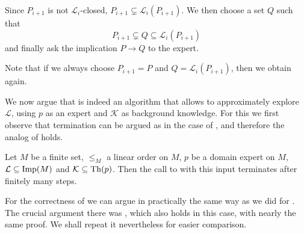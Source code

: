 Since $P_{i+1}$ is not $\mathcal{L}_{i}$-closed, $P_{i+1} \subsetneq
\mathcal{L}_{i}(P_{i+1})$.  We then choose a set $Q$ such that
\begin{equation*}
  P_{i+1} \subsetneq Q \subseteq \mathcal{L}_{i}(P_{i+1})
\end{equation*}
and finally ask the implication $P \to Q$ to the expert.

Note that if we always choose $P_{i+1} = P$ and $Q = \mathcal{L}_{i}(P_{i+1})$, then we
obtain  again.

We now argue that  is indeed an algorithm
that allows to approximately explore $\mathcal{L}$, using $p$ as an expert and
$\mathcal{K}$ as background knowledge.  For this we first observe that termination can be
argued as in the case of , and therefore the analog of
 holds.

\begin{Theorem}
  \label{thm:explore-implications-weaker-version-termination}
  Let $M$ be a finite set, $\leq_{M}$ a linear order on $M$, $p$ be a domain expert on
  $M$, $\mathcal{L} \subseteq \operatorname{Imp}(M)$ and $\mathcal{K} \subseteq \operatorname{Th}(p)$.  Then the call
  to  with this input terminates after
  finitely many steps.
\end{Theorem}

For the correctness of  we can argue in
practically the same way as we did for .  The crucial
argument there was , which also holds
in this case, with nearly the same proof.  We shall repeat it nevertheless for easier
comparison.

